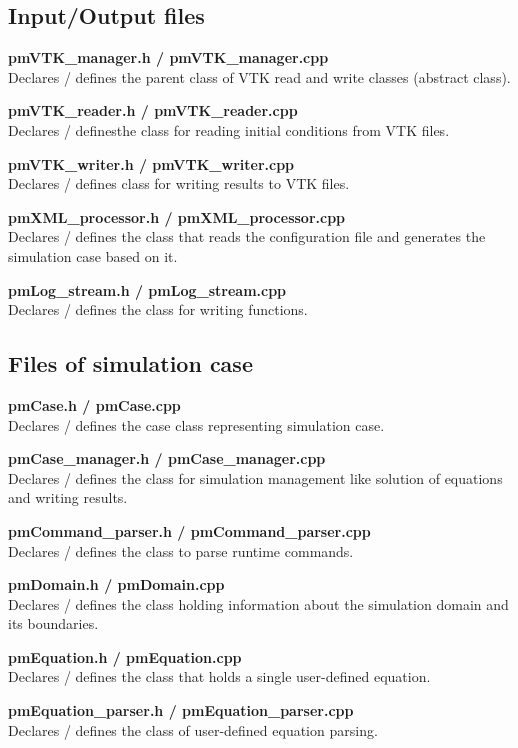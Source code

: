 \documentclass[a4paper,12pt,openany]{book}
\theoremstyle{break}
\begin{document}
\subsection{Input/Output files}

\textbf{pmVTK\_manager.h / pmVTK\_manager.cpp} \\
Declares / defines the parent class of VTK read and write classes (abstract class).

\textbf{pmVTK\_reader.h / pmVTK\_reader.cpp} \\
Declares / definesthe class for reading initial conditions from VTK files.

\textbf{pmVTK\_writer.h / pmVTK\_writer.cpp} \\
Declares / defines class for writing results to VTK files.

\textbf{pmXML\_processor.h / pmXML\_processor.cpp} \\
Declares / defines the class that reads the configuration file and generates the simulation case based on it.

\textbf{pmLog\_stream.h / pmLog\_stream.cpp} \\
Declares / defines the class for writing functions.


\subsection{Files of simulation case}

\textbf{pmCase.h / pmCase.cpp} \\
Declares / defines the case class representing  simulation case.

\textbf{pmCase\_manager.h / pmCase\_manager.cpp} \\
Declares / defines the class for simulation management like solution of equations and writing results.

\textbf{pmCommand\_parser.h / pmCommand\_parser.cpp} \\
Declares / defines the class to parse runtime commands.

\textbf{pmDomain.h / pmDomain.cpp} \\
Declares / defines the class holding information about the simulation domain and its boundaries.

\textbf{pmEquation.h / pmEquation.cpp} \\
Declares / defines the class that holds a single user-defined equation.

\textbf{pmEquation\_parser.h / pmEquation\_parser.cpp} \\
Declares / defines the class of user-defined equation parsing.
\end{document}
